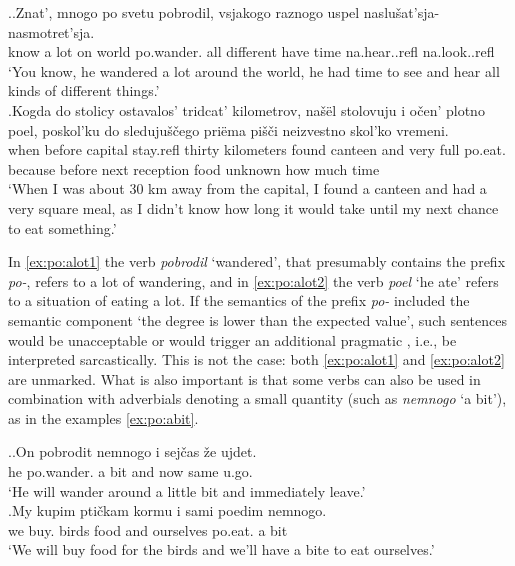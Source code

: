 \ex.\label{ex:po:alot}\ag.\label{ex:po:alot1}Znat', mnogo po svetu pobrodil, vsjakogo raznogo uspel {naslu\v{s}at'sja-} {nasmotret'sja.}\\
know {a lot} on world po.wander. all different {have time} na.hear..refl na.look..refl\\
\trans `You know, he wandered a lot around the world, he had time to see and hear all kinds of different things.'\\
\bg.\label{ex:po:alot2}Kogda do stolicy ostavalos' tridcat' kilometrov, na\v{s}\"{e}l stolovuju i o\v{c}en' plotno poel, poskol'ku do sleduju\v{s}\v{c}ego pri\"{e}ma pi\v{s}\v{c}i neizvestno skol'ko vremeni.\\
when before capital stay.refl thirty kilometers found canteen and very full po.eat. because before next reception food unknown {how much} time\\
\trans `When I was about 30 km away from the capital, I found a canteen and had a very square meal, as I didn't know how long it would take until my next chance to eat something.'\\

In \ref{ex:po:alot1} the verb \textit{pobrodil} `wandered', that presumably contains the  prefix \textit{po-}, refers to a lot of wandering, and in \ref{ex:po:alot2} the verb \textit{poel} `he ate' refers to a situation of eating a lot. If the semantics of the  prefix \textit{po-} included the semantic component `the degree is lower than the expected value', such sentences would be unacceptable or would trigger an additional pragmatic , i.e., be interpreted sarcastically. This is not the case: both \ref{ex:po:alot1} and \ref{ex:po:alot2} are unmarked. What is also important is that some verbs can also be used in combination with adverbials denoting a small quantity (such as \textit{nemnogo} `a bit'), as in the examples \ref{ex:po:abit}.

\ex.\label{ex:po:abit}\ag.On pobrodit nemnogo i sej\v{c}as \v{z}e ujdet.\\
he po.wander. {a bit} and now same u.go.\\
\trans `He will wander around a little bit and immediately leave.'\\
\bg.My kupim pti\v{c}kam kormu i sami poedim nemnogo.\\
we buy. birds food and ourselves po.eat. {a bit}\\
\trans `We will buy food for the birds and we'll have a bite to eat ourselves.'\\

